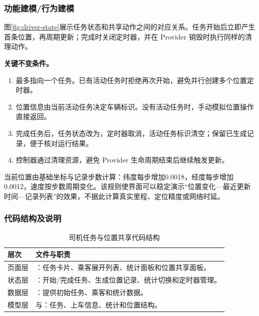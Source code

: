 \subsubsection{功能建模/行为建模}
图\ref{fig:driver-state}展示任务状态和共享动作之间的对应关系。任务开始后立即产生首条位置，再周期更新；完成时关闭定时器，并在 Provider 销毁时执行同样的清理动作。

\noindent\textbf{关键不变条件。}
\begin{enumerate}
\item {}最多指向一个任务。已有活动任务时拒绝再次开始，避免并行创建多个位置定时器。
\item 位置信息由当前活动任务决定车辆标识。没有活动任务时，手动模拟位置操作直接返回。
\item 完成任务后，任务状态改为，定时器取消，活动任务标识清空；保留已生成记录，便于核对运行结果。
\item 控制器通过清理资源，避免 Provider 生命周期结束后继续触发更新。
\end{enumerate}
当前位置由基础坐标与记录步数计算：纬度每步增加0.0018，经度每步增加0.0012，速度按步数周期变化。该规则使界面可以稳定演示“位置变化—最近更新时间—记录列表”的效果，不据此计算真实里程、定位精度或网络时延。

\subsubsection{代码结构及说明}
\begin{table}[H]\centering\small
\caption{司机任务与位置共享代码结构}
\begin{tabularx}{\linewidth}{|P{2.1cm}|Y|}\hline
层次 & 文件与职责\\\hline
页面层 & ：任务卡片、乘客展开列表、统计面板和位置共享面板。\\\hline
状态层 & ：开始/完成任务、生成位置记录、统计切换和定时器管理。\\\hline
数据层 & ：提供初始任务、乘客和统计数据。\\\hline
模型层 & 与：任务、上车信息、统计和位置结构。\\\hline
\end{tabularx}\end{table}


